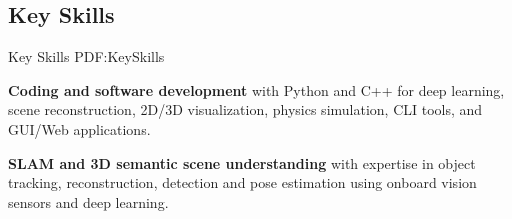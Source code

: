 \documentclass[letterpaper,MMMyyyy,nonstop]{simpleresumecv}
\begin{document}
\begin{body}
%
%
%
%


\section
{Key Skills}
{Key Skills}
{PDF:KeySkills}

\BulletItem
\textbf{Coding and software development} with Python and C++ for deep learning, scene reconstruction, 2D/3D visualization, physics simulation, CLI tools, and GUI/Web applications.

\GapNoBreak

\BulletItem
\textbf{SLAM and 3D semantic scene understanding} with expertise in object tracking, reconstruction, detection and pose estimation using onboard vision sensors and deep learning.

\GapNoBreak


\end{body}
\end{document}
